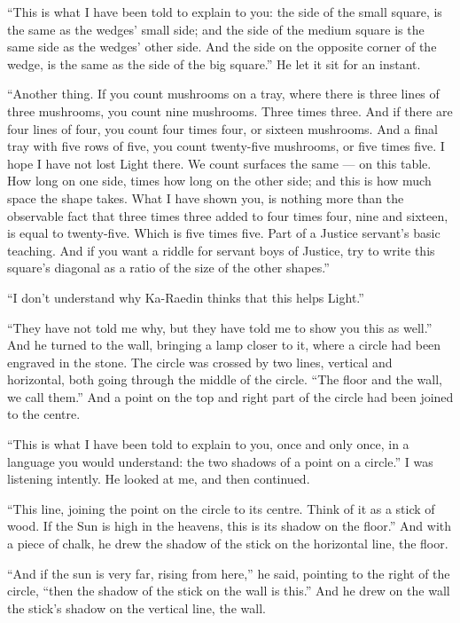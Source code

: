 ``This is what I have been told to explain to you: the side of the small square, is the same as the wedges' small side; and the side of the medium square is the same side as the wedges' other side. And the side on the opposite corner of the wedge, is the same as the side of the big square.'' He let it sit for an instant.

``Another thing. If you count mushrooms on a tray, where there is three lines of three mushrooms, you count nine mushrooms. Three times three. And if there are four lines of four, you count four times four, or sixteen mushrooms. And a final tray with five rows of five, you count twenty-five mushrooms, or five times five. I hope I have not lost Light there. We count surfaces the same --- on this table. How long on one side, times how long on the other side; and this is how much space the shape takes. What I have shown you, is nothing more than the observable fact that three times three added to four times four, nine and sixteen, is equal to twenty-five. Which is five times five. Part of a Justice servant's basic teaching. And if you want a riddle for servant boys of Justice, try to write this square's diagonal as a ratio of the size of the other shapes.''

``I don't understand why Ka-Raedin thinks that this helps Light.''

``They have not told me why, but they have told me to show you this as well.'' And he turned to the wall, bringing a lamp closer to it, where a circle had been engraved in the stone. The circle was crossed by two lines, vertical and horizontal, both going through the middle of the circle. ``The floor and the wall, we call them.'' And a point on the top and right part of the circle had been joined to the centre.

``This is what I have been told to explain to you, once and only once, in a language you would understand: the two shadows of a point on a circle.'' I was listening intently. He looked at me, and then continued.

``This line, joining the point on the circle to its centre. Think of it as a stick of wood. If the Sun is high in the heavens, this is its shadow on the floor.'' And with a piece of chalk, he drew the shadow of the stick on the horizontal line, the floor.

``And if the sun is very far, rising from here,'' he said, pointing to the right of the circle, ``then the shadow of the stick on the wall is this.'' And he drew on the wall the stick's shadow on the vertical line, the wall.

